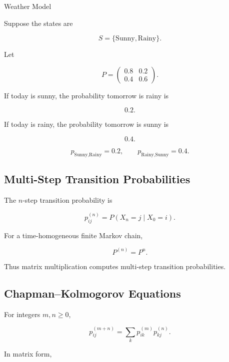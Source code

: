 \begin{workedexamplebox}{Weather Model}

Suppose the states are

\[
S=\{\text{Sunny},\text{Rainy}\}.
\]

Let

\[
P
=
\begin{pmatrix}
0.8&0.2\\
0.4&0.6
\end{pmatrix}.
\]

If today is sunny, the probability tomorrow is rainy is

\[
0.2.
\]

If today is rainy, the probability tomorrow is sunny is

\[
0.4.
\]

\begin{answerbox}
\[
\boxed{
p_{\text{Sunny,Rainy}}=0.2,
\qquad
p_{\text{Rainy,Sunny}}=0.4.
}
\]
\end{answerbox}

\end{workedexamplebox}

\subsection{Multi-Step Transition Probabilities}
\label{subsec:multi-step-transitions}

The \(n\)-step transition probability is

\[
\boxed{
p_{ij}^{(n)}
=
P(X_n=j\mid X_0=i).
}
\]

For a time-homogeneous finite Markov chain,

\[
\boxed{
P^{(n)}
=
P^n.
}
\]

Thus matrix multiplication computes multi-step transition probabilities.

\subsection{Chapman--Kolmogorov Equations}
\label{subsec:chapman-kolmogorov}

For integers \(m,n\geq0\),

\[
\boxed{
p_{ij}^{(m+n)}
=
\sum_k
p_{ik}^{(m)}
p_{kj}^{(n)}.
}
\]

In matrix form,

